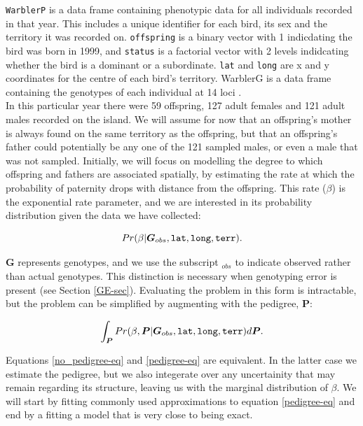 \documentclass{article}
\begin{document}
 \texttt{WarblerP} is a data frame containing phenotypic data for all individuals recorded in that year.  This includes a unique identifier for each bird, its sex and the territory it was recorded on. \texttt{offspring} is a binary vector with 1 indicdating the bird was born in 1999, and \texttt{status} is a factorial vector with 2 levels indidcating whether the bird is a dominant or a subordinate. \texttt{lat} and \texttt{long} are x and y coordinates for the centre of each bird's territory. {WarblerG} is a data frame containing the genotypes of each individual at 14 loci \citep{Richardson.2000}.\\

In this particular year there were 59 offspring, 127 adult females and 121 adult males recorded on the island.  We will assume for now that an offspring's mother is always found on the same territory as the offspring, but that an offspring's father could potentially be any one of the 121 sampled males, or even a male that was not sampled.  Initially, we will focus on modelling the degree to which offspring and fathers are associated spatially, by estimating the rate at which the probability of paternity drops with distance from the offspring.  This rate ($\beta$) is the exponential rate parameter, and we are interested in its probability distribution given the data we have collected:


\begin{equation}
Pr(\beta | \bm{G}_{obs}, \textrm{\texttt{lat}}, \textrm{\texttt{long}}, \textrm{\texttt{terr}}).
\label{no_pedigree-eq}
\end{equation}

$\bm{G}$ represents genotypes, and we use the subscript $_{obs}$ to indicate observed rather than actual genotypes. This distinction is necessary when genotyping error is present (see Section \ref{GE-sec}).  Evaluating the problem in this form is intractable, but the problem can be simplified by augmenting with the pedigree, $\bm{P}$:

\begin{equation}
\int_{\bm P}Pr(\beta,  {\bm P}| \bm{G}_{obs}, \textrm{\texttt{lat}}, \textrm{\texttt{long}}, \textrm{\texttt{terr}})d{\bm P}.
\label{pedigree-eq}
\end{equation}

Equations \ref{no_pedigree-eq} and \ref{pedigree-eq} are equivalent. In the latter case we estimate the pedigree, but we also integerate over any uncertainity that may remain regarding its structure, leaving us with the marginal distribution of $\beta$.  We will start by fitting commonly used approximations to equation \ref{pedigree-eq} and end by a fitting a model that is very close to being exact.
\end{document}
